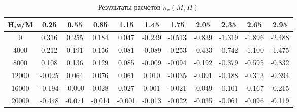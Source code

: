 \begin{table}[H]
\centering
\caption{Результаты расчётов $n_x(M,H)$}
\label{nx}
\begin{tabular}{|c|c|c|c|c|c|c|c|c|c|c|}
\toprule
H,м/M &   0.25 &   0.55 &   0.85 &   1.15 &   1.45 &   1.75 &   2.05 &   2.35 &   2.65 &   2.95 \\
\midrule
0     &  0.316 &  0.255 &  0.184 &  0.047 & -0.239 & -0.513 & -0.839 & -1.319 & -1.896 & -2.488 \\
4000  &  0.212 &  0.191 &  0.156 &  0.081 & -0.089 & -0.253 & -0.433 & -0.742 & -1.100 & -1.475 \\
8000  &  0.108 &  0.136 &  0.129 &  0.085 & -0.009 & -0.094 & -0.192 & -0.379 & -0.595 & -0.832 \\
12000 & -0.025 &  0.064 &  0.076 &  0.061 &  0.010 & -0.035 & -0.091 & -0.188 & -0.313 & -0.394 \\
16000 & -0.194 & -0.000 &  0.028 &  0.027 &  0.001 & -0.021 & -0.049 & -0.101 & -0.167 & -0.215 \\
20000 & -0.448 & -0.071 & -0.014 & -0.001 & -0.013 & -0.022 & -0.035 & -0.061 & -0.096 & -0.119 \\
\bottomrule
\end{tabular}
\end{table}
